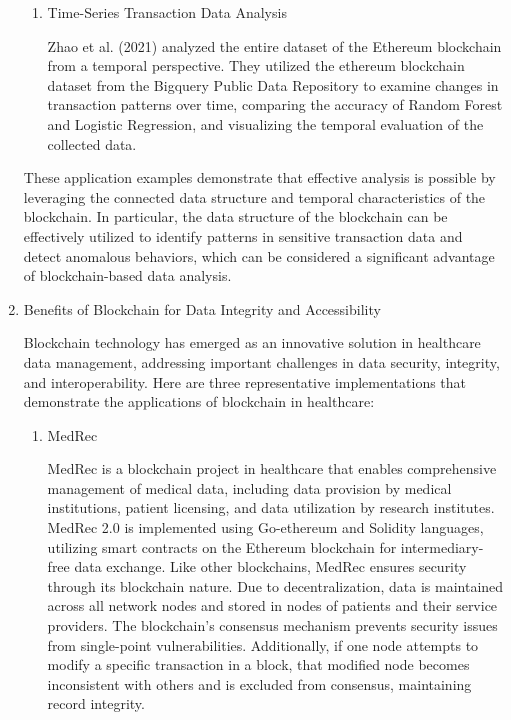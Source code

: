 \documentclass[conference]{IEEEtran}
\begin{document}
\begin{enumerate}[itemsep=2ex, parsep=1ex]
\begin{enumerate}[itemsep=2ex, parsep=1ex]
	      	\item Time-Series Transaction Data Analysis
	      	      	      	      	      	      
	      	      Zhao et al. (2021) analyzed the entire dataset of the Ethereum blockchain from a temporal perspective. They utilized the ethereum blockchain dataset from the Bigquery Public Data Repository to examine changes in transaction patterns over time, comparing the accuracy of Random Forest and Logistic Regression, and visualizing the temporal evaluation of the collected data.
	      \end{enumerate}
	      	      	      
	      These application examples demonstrate that effective analysis is possible by leveraging the connected data structure and temporal characteristics of the blockchain. In particular, the data structure of the blockchain can be effectively utilized to identify patterns in sensitive transaction data and detect anomalous behaviors, which can be considered a significant advantage of blockchain-based data analysis.
	      	      	      
	\item Benefits of Blockchain for Data Integrity and Accessibility
	      	      	      
	      Blockchain technology has emerged as an innovative solution in healthcare data management, addressing important challenges in data security, integrity, and interoperability. Here are three representative implementations that demonstrate the applications of blockchain in healthcare:
	      	      	      
	      \begin{enumerate}[itemsep=2ex, parsep=1ex]
	      	\item MedRec
	      	      	      	      	      	      
	      	      MedRec is a blockchain project in healthcare that enables comprehensive management of medical data, including data provision by medical institutions, patient licensing, and data utilization by research institutes. MedRec 2.0 is implemented using Go-ethereum and Solidity languages, utilizing smart contracts on the Ethereum blockchain for intermediary-free data exchange. Like other blockchains, MedRec ensures security through its blockchain nature. Due to decentralization, data is maintained across all network nodes and stored in nodes of patients and their service providers. The blockchain's consensus mechanism prevents security issues from single-point vulnerabilities. Additionally, if one node attempts to modify a specific transaction in a block, that modified node becomes inconsistent with others and is excluded from consensus, maintaining record integrity.
	      	      	      	      	      	      

\end{enumerate}
\end{enumerate}
\end{document}
